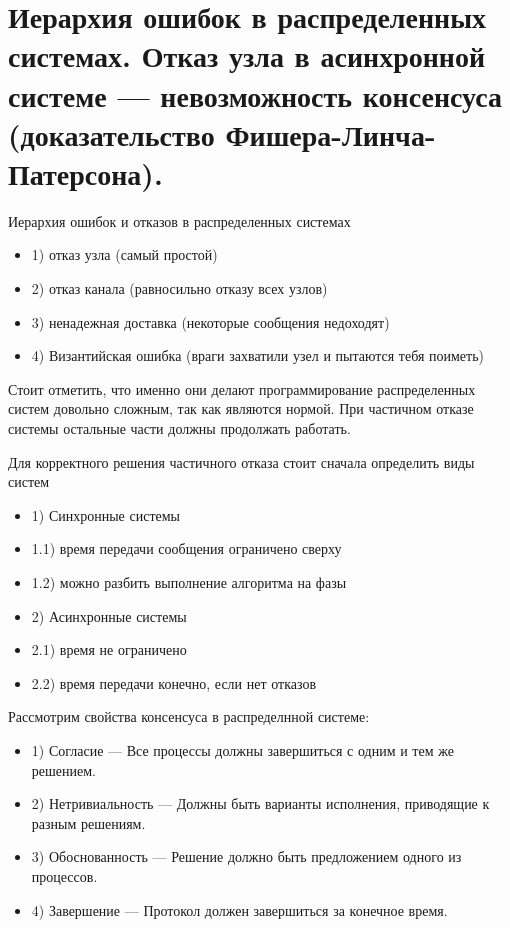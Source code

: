 \section{Иерархия ошибок в распределенных системах. Отказ узла в асинхронной системе --- невозможность консенсуса (доказательство Фишера-Линча-Патерсона).}
 
\begin{definition} Иерархия ошибок и отказов в распределенных системах
    \begin{itemize}
        \item 1) отказ узла (самый простой)
        \item 2) отказ канала (равносильно отказу всех узлов)
        \item 3) ненадежная доставка (некоторые сообщения недоходят)
        \item 4) Византийская ошибка (враги захватили узел и пытаются тебя поиметь)
    \end{itemize}
\end{definition}
 
\begin{remark}
Стоит отметить, что именно они делают программирование распределенных систем довольно сложным, так как являются нормой. При частичном отказе системы остальные части должны продолжать работать.
 
Для корректного решения частичного отказа стоит сначала определить виды систем
\begin{itemize}
    \item 1) Синхронные системы 
    \item 1.1) время передачи сообщения ограничено сверху
    \item 1.2) можно разбить выполнение алгоритма на фазы
    \item 2) Асинхронные системы
    \item 2.1) время не ограничено 
    \item 2.2) время передачи конечно, если нет отказов
\end{itemize}
\end{remark}
 
\begin{definition} Рассмотрим свойства консенсуса в распределнной системе:
    \begin{itemize}
        \item 1) Согласие --- Все процессы должны завершиться с одним и тем же решением.
        \item 2) Нетривиальность --- Должны быть варианты исполнения, приводящие к разным решениям.
        \item 3) Обоснованность --- Решение должно быть предложением одного из процессов.
        \item 4) Завершение --- Протокол должен завершиться за конечное время.
    \end{itemize} 
\end{definition}
 
